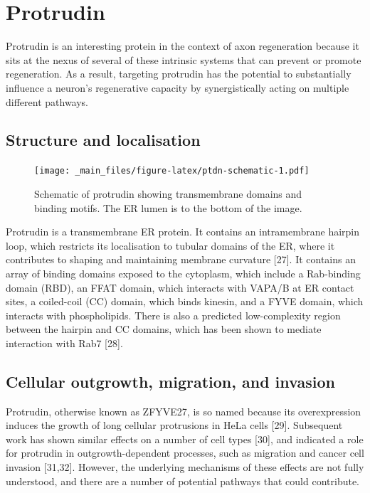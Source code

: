 \documentclass[
  12pt,
  a4paper,
]{book}
\begin{document}
\hypertarget{intro-ptdn}{%
\section{Protrudin}\label{intro-ptdn}}

Protrudin is an interesting protein in the context of axon regeneration because it sits at the nexus of several of these intrinsic systems that can prevent or promote regeneration. As a result, targeting protrudin has the potential to substantially influence a neuron's regenerative capacity by synergistically acting on multiple different pathways.

\hypertarget{structure-and-localisation}{%
\subsection{Structure and localisation}\label{structure-and-localisation}}

\begin{figure}
\centering
\texttt{[image: \_main\_files/figure-latex/ptdn-schematic-1.pdf]}
\caption{\label{fig:ptdn-schematic}Schematic of protrudin showing transmembrane domains and binding motifs. The ER lumen is to the bottom of the image.}
\end{figure}

Protrudin is a transmembrane ER protein. It contains an intramembrane hairpin loop, which restricts its localisation to tubular domains of the ER, where it contributes to shaping and maintaining membrane curvature {[}27{]}. It contains an array of binding domains exposed to the cytoplasm, which include a Rab-binding domain (RBD), an FFAT domain, which interacts with VAPA/B at ER contact sites, a coiled-coil (CC) domain, which binds kinesin, and a FYVE domain, which interacts with phospholipids. There is also a predicted low-complexity region between the hairpin and CC domains, which has been shown to mediate interaction with Rab7 {[}28{]}.

\hypertarget{cellular-outgrowth-migration-and-invasion}{%
\subsection{Cellular outgrowth, migration, and invasion}\label{cellular-outgrowth-migration-and-invasion}}

Protrudin, otherwise known as ZFYVE27, is so named because its overexpression induces the growth of long cellular protrusions in HeLa cells {[}29{]}. Subsequent work has shown similar effects on a number of cell types {[}30{]}, and indicated a role for protrudin in outgrowth-dependent processes, such as migration and cancer cell invasion {[}31,32{]}. However, the underlying mechanisms of these effects are not fully understood, and there are a number of potential pathways that could contribute.
\end{document}
